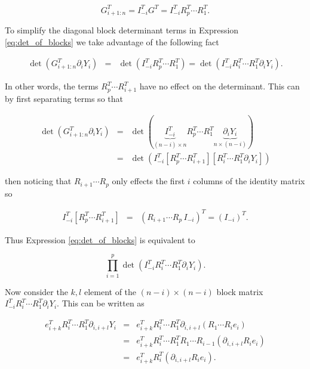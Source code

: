 \documentclass[ba]{imsart}
\numberwithin{equation}{section}
\theoremstyle{plain}
\begin{document}
\begin{equation}
G_{i+1:n}^T = I_{-i}^T G^T = I_{-i}^T R_p^T \cdots R_1^T.
\end{equation}

\noindent To simplify the diagonal block determinant terms in Expression \ref{eq:det_of_blocks} we take advantage of the following fact

\begin{eqnarray}
\det \left( G_{i+1:n}^T \partial_i Y_i  \right)  &=& \det \left( I_{-i}^T R_p^T \cdots R_1^T \right) =  \det\left( I_{-i}^T R_i^T \cdots R_1^T \partial_i Y_i \right).
\end{eqnarray}

\noindent In other words, the terms $R_p^T \cdots R_{i+1}^T$ have no effect on the determinant. This can by first separating terms so that

\begin{eqnarray}
\det\left(G_{i+1:n}^T \partial_{i} Y_i \right) &=& \det\left( \underbrace{I_{-i}^T}_{(n-i) \times n} R_p^T \cdots R_1^T \underbrace{\partial_i Y_i}_{n \times (n-i)} \right)\\
&=& \det\left(
I_{-i}^T
\left[ R_p^T \cdots R_{i+1}^T\right] \left[ R_i^T \cdots R_1^T \partial_i Y_i \right] \right)
\end{eqnarray}

\noindent then noticing that $R_{i+1} \cdots R_p$ only effects the first $i$ columns of the identity matrix so 

\begin{eqnarray}
I_{-i}^T
\left[ R_p^T \cdots R_{i+1}^T\right]  &=& \left( R_{i+1} \cdots R_p\, I_{-i} \right)^T = \left( I_{-i} \right)^T.
\end{eqnarray}

\noindent Thus Expression \ref{eq:det_of_blocks} is equivalent to

\begin{equation}
\label{eq:simplified_determinant}
\prod_{i=1}^p \det \left( I_{-i}^T R_i^T \cdots R_1^T \partial_{i} Y_i \right).
\end{equation}

\noindent Now consider the $k,l$ element of the $(n-i) \times (n-i)$ block matrix $I_{-i}^T R_i^T \cdots R_1^T \partial_{i} Y_i $. This can be written as 

\begin{eqnarray}
\label{eq:kl_element}
e_{i+k}^T R_i^T \cdots R_1^T \partial_{i,i+l} Y_i &=&  e_{i+k}^T R_i^T \cdots R_1^T \partial_{i,i+l} (R_1 \cdots R_i e_i)\nonumber \\ \nonumber
&=&  e_{i+k}^T R_i^T \cdots R_1^T R_1 \cdots R_{i-1} (\partial_{i,i+l} R_i e_i)\nonumber \\ 
&=&  e_{i+k}^T R_i^T  (\partial_{i,i+l} R_i e_i).
\end{eqnarray}
\end{document}

